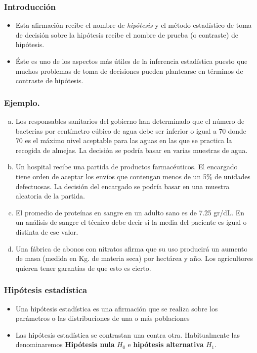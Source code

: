 \begin{frame}
\frametitle{Introducción}
 \begin{itemize}
\item  Esta afirmación recibe el nombre de \emph{hipótesis} y el método estadístico de toma de decisión sobre la  hipótesis recibe el nombre de prueba (o contraste) de hipótesis.
\item  Éste es uno de los aspectos más útiles de la inferencia estadística puesto que muchos problemas de toma de decisiones pueden plantearse en términos de contraste de hipótesis.
\end{itemize}
\end{frame}

\begin{frame}
   \frametitle{Ejemplo.}
    \begin{enumerate}[a)]
  \item Los responsables sanitarios del gobierno han determinado que el número de bacterias por centímetro cúbico de agua debe ser inferior o igual a 70  donde $70$ es el máximo nivel aceptable para las aguas en las que se practica la recogida de almejas. La decisión se podría basar en varias muestras de agua.
  \item Un  hospital recibe una partida de productos farmacéuticos. El encargado
    tiene orden de aceptar los envíos que contengan menos de un 5\% de
    unidades defectuosas. La decisión del encargado se podría basar en una
    muestra aleatoria de la partida.
\item El promedio de proteínas en sangre en un adulto sano es de 7.25 gr/dL. En un análisis de sangre el técnico debe decir si la media del paciente es igual o distinta de ese valor.
 \item Una fábrica de abonos con nitratos afirma que su uso producirá un aumento de masa (medida en Kg. de materia seca)  por hectárea y año. Los agricultores quieren tener garantías de que esto es cierto.
\end{enumerate}

\end{frame}

\begin{frame}
\frametitle{Hipótesis estadística}
\begin{itemize}
\item Una hipótesis estadística es una afirmación que se realiza sobre los parámetros o las distribuciones de una o más poblaciones
\item Las hipótesis estadística se contrastan una contra otra. Habitualmente las
denominaremos  \textbf{Hipótesis nula} $H_{0}$  e  \textbf{hipótesis alternativa}
$H_{1}$.
\end{itemize}
\end{frame}

